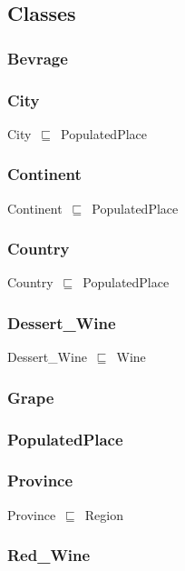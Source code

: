 \documentclass{article}
\begin{document}
\subsection*{Classes}

\subsubsection*{Bevrage}

\subsubsection*{City}

City~\ensuremath{\sqsubseteq}~PopulatedPlace~

\subsubsection*{Continent}

Continent~\ensuremath{\sqsubseteq}~PopulatedPlace~

\subsubsection*{Country}

Country~\ensuremath{\sqsubseteq}~PopulatedPlace~

\subsubsection*{Dessert\_Wine}

Dessert\_Wine~\ensuremath{\sqsubseteq}~Wine~

\subsubsection*{Grape}

\subsubsection*{PopulatedPlace}

\subsubsection*{Province}

Province~\ensuremath{\sqsubseteq}~Region~

\subsubsection*{Red\_Wine}
\end{document}
